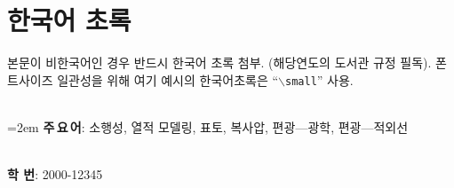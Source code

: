 \documentclass[12pt]{report}
\begin{document}
%




\chapter*{한국어 초록}%
{\small
\quad 본문이 비한국어인 경우 반드시 한국어 초록 첨부. (해당연도의 도서관 규정 필독). 폰트사이즈 일관성을 위해 여기 예시의 한국어초록은 ``$\backslash$\texttt{small}'' 사용.

~\\
\hangindent=2em
\textbf{주\,요\,어}: 소행성, 열적 모델링, 표토, 복사압, 편광---광학, 편광---적외선

~\\
\noindent \textbf{학 \quad 번}: 2000-12345
}


{}
\small
\footnotesize
{}
\setlength{\parskip}{0.3em}

\end{document}
